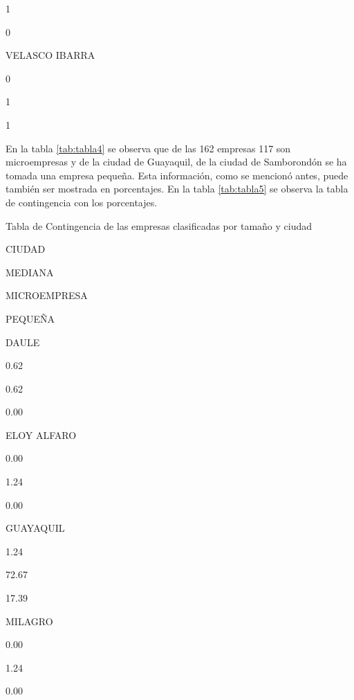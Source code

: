 \documentclass[]{book}
\newenvironment{Shaded}{\begin{snugshade}}{\end{snugshade}}
\newcommand{\KeywordTok}[1]{\textcolor[rgb]{0.13,0.29,0.53}{\textbf{#1}}}
\newcommand{\DataTypeTok}[1]{\textcolor[rgb]{0.13,0.29,0.53}{#1}}
\newcommand{\DecValTok}[1]{\textcolor[rgb]{0.00,0.00,0.81}{#1}}
\newcommand{\StringTok}[1]{\textcolor[rgb]{0.31,0.60,0.02}{#1}}
\newcommand{\OperatorTok}[1]{\textcolor[rgb]{0.81,0.36,0.00}{\textbf{#1}}}
\newcommand{\NormalTok}[1]{#1}
\begin{document}
1

0

VELASCO IBARRA

0

1

1

En la tabla \ref{tab:tabla4} se observa que de las 162 empresas 117 son
microempresas y de la ciudad de Guayaquil, de la ciudad de Samborondón
se ha tomada una empresa pequeña. Esta información, como se mencionó
antes, puede también ser mostrada en porcentajes. En la tabla
\ref{tab:tabla5} se observa la tabla de contingencia con los
porcentajes.

\begin{Shaded}
\end{Shaded}

\label{tab:tabla5}Tabla de Contingencia de las empresas clasificadas por
tamaño y ciudad

CIUDAD

MEDIANA

MICROEMPRESA

PEQUEÑA

DAULE

0.62

0.62

0.00

ELOY ALFARO

0.00

1.24

0.00

GUAYAQUIL

1.24

72.67

17.39

MILAGRO

0.00

1.24

0.00
\end{document}
